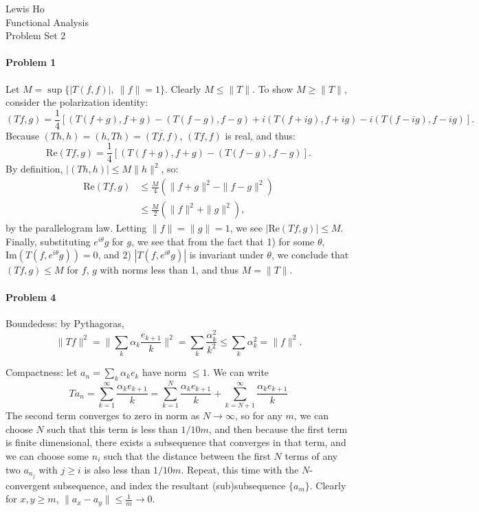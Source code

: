 \documentclass[12pt]{article}
\begin{document}
\begin{center}
  Lewis Ho\\
  Functional Analysis\\
  Problem Set 2
\end{center}

\paragraph{Problem 1}
Let $M = \sup\{|T(f,f)|,\ \|f\| = 1\}$. Clearly $M \leq \|T\|$. To show $M \geq
\|T\|$, consider the polarization identity:
\begin{displaymath}
  (Tf, g) = \frac{1}{4}[(T(f+g),f+g)-(T(f-g),f-g)+i(T(f+ig),f+ig)-i(T(f-ig),
  f-ig)].
\end{displaymath}
Because $(Th,h) = (h,Th) = \overline{(Tf,f)}$, $(Tf,f)$ is real, and thus:
\begin{displaymath}
  \text{Re}(Tf,g) = \frac{1}{4}[(T(f+g),f+g)- (T(f-g),f-g)].
\end{displaymath}
By definition, $|(Th,h)|\leq M\|h\|^2$, so:
\begin{align*}
  \text{Re}(Tf,g) &\leq \frac{M}{4}(\|f+g\|^2 - \|f-g\|^2)\\
  & \leq \frac{M}{2}(\|f\|^2 + \|g\|^2),
\end{align*}
by the parallelogram law. Letting $\|f\| = \|g\| = 1$, we see $|\text{Re}(Tf,g)
| \leq M$. Finally, substituting $e^{i\theta}g$ for $g$, we see that from the fact
that 1) for some $\theta$, $\text{Im}(T(f, e^{i\theta}g)) = 0$, and 2) $|T(f, e^
{i\theta}g)|$ is invariant under $\theta$, we conclude that $(Tf, g) \leq M$ for
$f$, $g$ with norms less than 1, and thus $M = \|T\|$.

\paragraph{Problem 4}

Boundedess: by Pythagoras,
\begin{displaymath}
  \|Tf\|^2 = \|\sum_k\alpha_k\frac{e_{k+1}}{k}\|^2 = \sum_k\frac{\alpha^2_k}{k^2}
  \leq \sum_k \alpha^2_k = \|f\|^2.
\end{displaymath}

Compactness: let $a_n=\sum_k\alpha_ke_k$ have norm $\leq 1$. We can write
\begin{displaymath}
  Ta_n = \sum_{k=1}^\infty\frac{\alpha_ke_{k+1}}{k} = 
  \sum_{k=1}^N\frac{\alpha_ke_{k+1}}{k} + \sum_{k=N+1}^\infty \frac{\alpha_ke_{k+1}}
  {k}
\end{displaymath}
The second term converges to zero in norm as $N \to \infty$, so for any $m$, we can
choose $N$ such that this term is less than $1/{10m}$, and then because the
first term is finite dimensional, there exists a subsequence that converges
in that term, and we can choose some $n_i$ such that the distance
between the first $N$ terms of any two $a_{n_j}$ with $j\geq i$ is also less than
$1/{10m}$. Repeat, this time with the $N$-convergent subsequence, and index
the resultant (sub)subsequence $\{a_m\}$. Clearly for $x, y \geq m$, $\|a_x
- a_y\| \leq \frac{1}{m} \to 0$.
\end{document}
